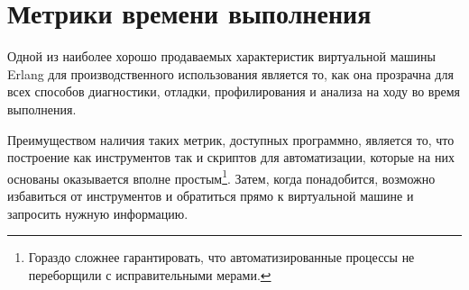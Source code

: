 \documentclass[11pt, oneside]{book}   	%
\begin{document}


\chapter{Метрики времени выполнения}
\label{chap:runtime-metrics}

Одной из наиболее хорошо продаваемых характеристик виртуальной машины Erlang для производственного использования является то, как она прозрачна для всех способов диагностики, отладки, профилирования и анализа на ходу во время выполнения.

Преимуществом наличия таких метрик, доступных программно, является то, что построение как инструментов так и скриптов для автоматизации, которые на них основаны оказывается вполне простым\footnote{Гораздо сложнее гарантировать, что автоматизированные процессы не переборщили с исправительными мерами.}. Затем, когда понадобится, возможно избавиться от инструментов и обратиться прямо к виртуальной машине и запросить нужную информацию.
\end{document}
